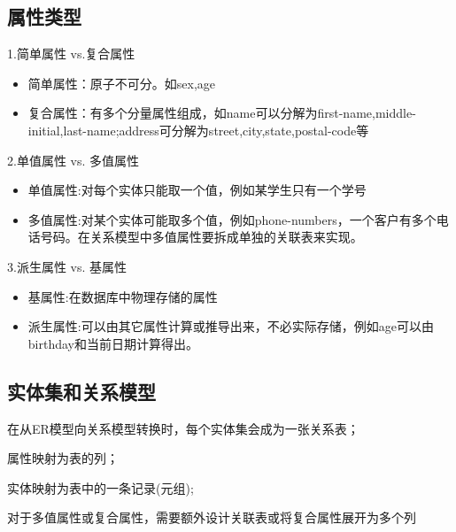 \subsection{属性类型}

1.简单属性 vs.复合属性
\begin{itemize}
    \item 简单属性：原子不可分。如sex,age
    \item 复合属性：有多个分量属性组成，如name可以分解为first-name,middle-initial,last-name;address可分解为street,city,state,postal-code等
\end{itemize}

2.单值属性 vs. 多值属性
\begin{itemize}
    \item 单值属性:对每个实体只能取一个值，例如某学生只有一个学号
    \item 多值属性:对某个实体可能取多个值，例如phone-numbers，一个客户有多个电话号码。在关系模型中多值属性要拆成单独的关联表来实现。
\end{itemize}

3.派生属性 vs. 基属性
\begin{itemize}
    \item 基属性:在数据库中物理存储的属性
    \item 派生属性:可以由其它属性计算或推导出来，不必实际存储，例如age可以由birthday和当前日期计算得出。
\end{itemize}

\subsection{实体集和关系模型}

在从ER模型向关系模型转换时，每个实体集会成为一张关系表；

属性映射为表的列；

实体映射为表中的一条记录(元组);

对于多值属性或复合属性，需要额外设计关联表或将复合属性展开为多个列